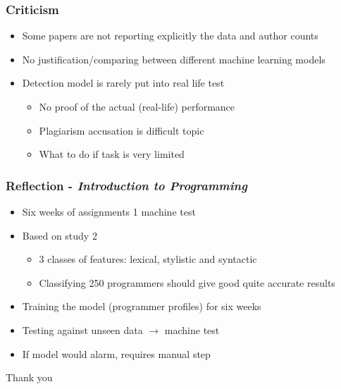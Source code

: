 \documentclass[t,12pt,pdftex]{beamer}
\begin{document}
\begin{frame}
	\frametitle{Criticism}
	\begin{itemize}
		\item Some papers are not reporting explicitly the data and author counts
		\item No justification/comparing between different machine learning models
		\item Detection model is rarely put into real life test
		\begin{itemize}
			\item No proof of the actual (real-life) performance
			\item Plagiarism accusation is difficult topic
			\item What to do if task is very limited
		\end{itemize}
	\end{itemize}
\end{frame}

\begin{frame}
	\frametitle{Reflection - \textit{Introduction to Programming}}
	\begin{itemize}
		\item Six weeks of assignments 1 machine test		
		\item Based on study 2
		\begin{itemize}
			\item 3 classes of features: lexical, stylistic and syntactic
			\item Classifying 250 programmers should give good quite accurate results	
		\end{itemize}
		\item Training the model (programmer profiles) for six weeks
		\item Testing against unseen data $\rightarrow$ machine test	 		\item If model would alarm, requires manual step
	\end{itemize}
\end{frame}

\begin{frame}
	\vspace{1.5in}
	Thank you
\end{frame}
\end{document}
